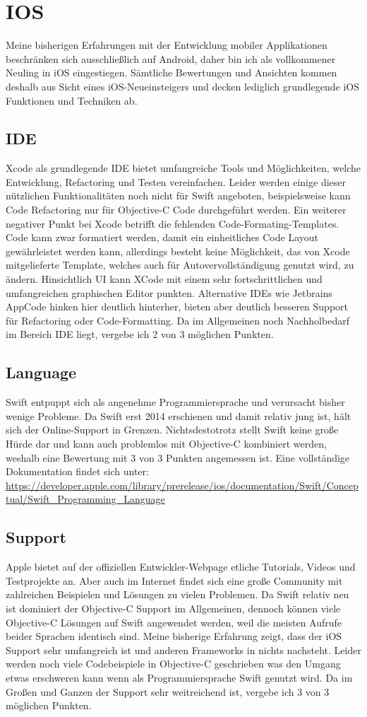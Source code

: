 \section{IOS}
Meine bisherigen Erfahrungen mit der Entwicklung mobiler Applikationen beschränken sich ausschließlich auf Android, daher bin ich als vollkommener Neuling in iOS eingestiegen. Sämtliche Bewertungen und Ansichten kommen deshalb aus Sicht eines iOS-Neueinsteigers und decken lediglich grundlegende iOS Funktionen und Techniken ab.
\subsection{IDE}
Xcode als grundlegende IDE bietet umfangreiche Tools und Möglichkeiten, welche Entwicklung, Refactoring und Testen vereinfachen. Leider werden einige dieser nützlichen Funktionalitäten noch nicht für Swift angeboten, beispielsweise kann Code Refactoring nur für Objective-C Code durchgeführt werden. Ein weiterer negativer Punkt bei Xcode betrifft die fehlenden Code-Formating-Templates. Code kann zwar formatiert werden, damit ein einheitliches Code Layout gewährleistet werden kann, allerdings besteht keine Möglichkeit, das von Xcode mitgelieferte Template, welches auch für Autovervollständigung genutzt wird, zu ändern. Hinsichtlich UI kann XCode mit einem sehr fortschrittlichen und umfangreichen graphischen Editor punkten. Alternative IDEs wie Jetbrains AppCode hinken hier deutlich hinterher, bieten aber deutlich besseren Support für Refactoring oder Code-Formatting. Da im Allgemeinen noch Nachholbedarf im Bereich IDE liegt, vergebe ich 2 von 3 möglichen Punkten.
\subsection{Language}
Swift entpuppt sich als angenehme Programmiersprache und verursacht bisher wenige Probleme. Da Swift erst 2014 erschienen und damit relativ jung ist, hält sich der Online-Support in Grenzen. Nichtsdestotrotz stellt Swift keine große Hürde dar und kann auch problemlos mit Objective-C kombiniert werden, weshalb eine Bewertung mit 3 von 3 Punkten angemessen ist. Eine vollständige Dokumentation findet sich unter: \\ \url{https://developer.apple.com/library/prerelease/ios/documentation/Swift/Conceptual/Swift_Programming_Language}
\subsection{Support}
Apple bietet auf der offiziellen Entwickler-Webpage etliche Tutorials, Videos und Testprojekte an. Aber auch im Internet findet sich eine große Community mit zahlreichen Beispielen und Lösungen zu vielen Problemen. Da Swift relativ neu ist dominiert der Objective-C Support im Allgemeinen, dennoch können viele Objective-C Lösungen auf Swift angewendet werden, weil die meisten Aufrufe beider Sprachen identisch sind. Meine bisherige Erfahrung zeigt, dass der iOS Support sehr umfangreich ist und anderen Frameworks in nichts nachsteht. Leider werden noch viele Codebeispiele in Objective-C geschrieben was den Umgang etwas erschweren kann wenn als Programmiersprache Swift genutzt wird. Da im Großen und Ganzen der Support sehr weitreichend ist, vergebe ich 3 von 3 möglichen Punkten.
